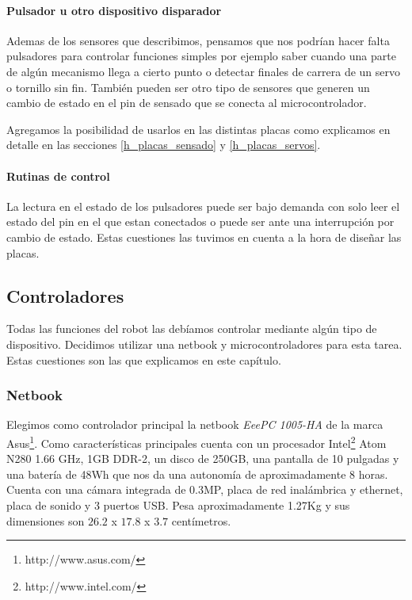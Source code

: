 \paragraph{Pulsador u otro dispositivo disparador}
\label{h_sensado_pulsador}

Ademas de los sensores que describimos, pensamos que nos podr\'ian hacer falta pulsadores para controlar funciones
simples por ejemplo saber cuando una parte de alg\'un mecanismo llega a cierto punto o detectar finales de carrera
de un servo o tornillo sin fin.
Tambi\'en pueden ser otro tipo de sensores que generen un cambio de estado en el pin de sensado que se conecta al
microcontrolador.

Agregamos la posibilidad de usarlos en las distintas placas como explicamos en detalle en las secciones
\ref{h_placas_sensado} y \ref{h_placas_servos}.

\paragraph{Rutinas de control}
\label{h_sensado_pulsador_rutinas}

La lectura en el estado de los pulsadores puede ser bajo demanda con solo leer el estado del pin en el que estan
conectados o puede ser ante una interrupci\'on por cambio de estado.
Estas cuestiones las tuvimos en cuenta a la hora de dise\~nar las placas.

\subsection{Controladores}
\label{h_controlador}

Todas las funciones del robot las deb\'iamos controlar mediante alg\'un tipo de dispositivo.
Decidimos utilizar una netbook y microcontroladores para esta tarea.
Estas cuestiones son las que explicamos en este cap\'itulo.

\subsubsection{Netbook}
\label{h_controlador_netbook}

Elegimos como controlador principal la netbook \emph{EeePC 1005-HA} de la marca Asus\footnote{http://www.asus.com/}.
Como caracter\'isticas principales cuenta con un procesador Intel\footnote{http://www.intel.com/} Atom N280 1.66 GHz,
1GB DDR-2, un disco de 250GB, una pantalla de 10 pulgadas y una bater\'ia de 48Wh que nos da una autonom\'ia de 
aproximadamente 8 horas.
Cuenta con una c\'amara integrada de 0.3MP, placa de red inal\'ambrica y ethernet, placa de sonido y 3 puertos USB.
Pesa aproximadamente 1.27Kg y sus dimensiones son $26.2$ x $17.8$ x $3.7$ cent\'imetros.

